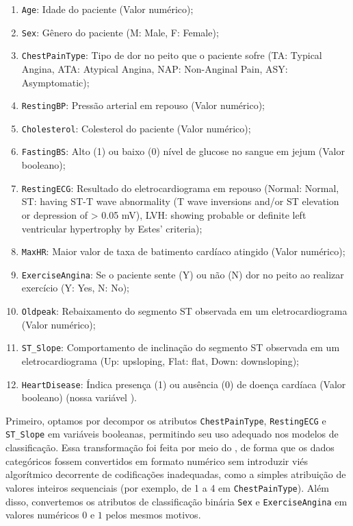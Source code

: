   \begin{enumerate}
    \item \texttt{Age}: Idade do paciente (Valor numérico);
    \item \texttt{Sex}: Gênero do paciente (M: Male, F: Female);
    \item \texttt{ChestPainType}: Tipo de dor no peito que o paciente sofre (TA: Typical Angina, ATA: Atypical Angina, NAP: Non-Anginal Pain, ASY: Asymptomatic);
    \item \texttt{RestingBP}: Pressão arterial em repouso (Valor numérico);
    \item \texttt{Cholesterol}: Colesterol do paciente (Valor numérico);
    \item \texttt{FastingBS}: Alto (1) ou baixo (0) nível de glucose no sangue em jejum (Valor booleano);
    \item \texttt{RestingECG}: Resultado do eletrocardiograma em repouso (Normal: Normal, ST: having ST-T wave abnormality (T wave inversions and/or ST elevation or depression of > 0.05 mV), LVH: showing probable or definite left ventricular hypertrophy by Estes' criteria);
    \item \texttt{MaxHR}: Maior valor de taxa de batimento cardíaco atingido (Valor numérico);
    \item \texttt{ExerciseAngina}: Se o paciente sente (Y) ou não (N) dor no peito ao realizar exercício (Y: Yes, N: No);
    \item \texttt{Oldpeak}: Rebaixamento do segmento ST observada em um eletrocardiograma (Valor numérico);
    \item \texttt{ST\_Slope}: Comportamento de inclinação do segmento ST observada em um eletrocardiograma (Up: upsloping, Flat: flat, Down: downsloping);
    \item \texttt{HeartDisease}: Índica presença (1) ou ausência (0) de doença cardíaca (Valor booleano) (nossa variável ).
  \end{enumerate}

  Primeiro, optamos por decompor os atributos \texttt{ChestPainType}, \texttt{RestingECG} e \texttt{ST\_Slope} em variáveis booleanas, permitindo seu uso adequado nos modelos de classificação. Essa transformação foi feita por meio do , de forma que os dados categóricos fossem convertidos em formato numérico sem introduzir viés algorítmico decorrente de codificações inadequadas, como a simples atribuição de valores inteiros sequenciais (por exemplo, de 1 a 4 em \texttt{ChestPainType}). Além disso, convertemos os atributos de classificação binária \texttt{Sex} e \texttt{ExerciseAngina} em valores numéricos $0$ e $1$ pelos mesmos motivos.

